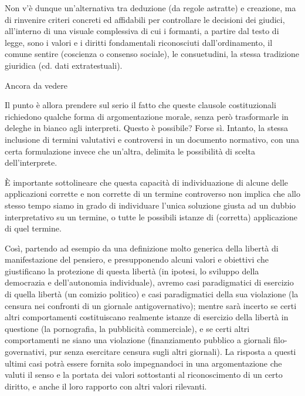Non v'è dunque un'alternativa tra deduzione (da regole astratte) e creazione, ma di rinvenire criteri concreti ed affidabili per controllare le decisioni dei giudici, all'interno di una visuale complessiva di cui i formanti, a partire dal testo di legge, sono i valori e i diritti fondamentali riconosciuti
dall'ordinamento, il comune sentire (coscienza o consenso sociale), le consuetudini, la stessa tradizione giuridica (cd. dati extratestuali).


Ancora da vedere


Il punto è allora prendere sul serio il fatto che queste clausole costituzionali richiedono qualche forma di argomentazione morale, senza però trasformarle in deleghe in bianco agli interpreti. Questo è possibile?
Forse sì. Intanto, la stessa inclusione di termini valutativi e controversi in un documento normativo, con una certa formulazione invece che un’altra, delimita le possibilità di scelta dell’interprete.

È importante sottolineare che questa capacità di individuazione di alcune delle applicazioni corrette e non
corrette di un termine controverso non implica che allo stesso tempo siamo in grado di individuare l’unica soluzione giusta ad un dubbio interpretativo su un termine, o tutte le possibili istanze di (corretta) applicazione di quel termine.

Così, partendo ad esempio da una definizione molto generica della libertà di manifestazione del pensiero, e presupponendo alcuni valori e obiettivi che giustificano la protezione di questa libertà (in ipotesi, lo sviluppo della democrazia e dell’autonomia individuale), avremo casi paradigmatici di esercizio di quella libertà (un comizio politico) e casi paradigmatici della sua violazione (la censura nei confronti di un giornale antigovernativo); mentre sarà incerto se certi altri comportamenti costituiscano realmente istanze di esercizio della libertà in questione (la pornografia, la pubblicità commerciale), e se certi altri comportamenti ne siano una violazione (finanziamento pubblico a giornali filo-governativi, pur senza esercitare censura sugli altri giornali). La risposta a questi ultimi casi potrà essere fornita solo impegnandoci in una argomentazione che valuti il senso e la portata dei valori sottostanti al riconoscimento di un certo diritto, e anche il loro rapporto con altri valori rilevanti.

